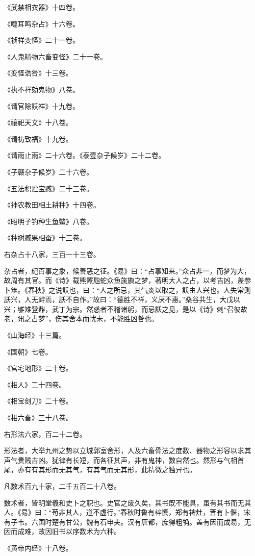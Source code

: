 \documentclass[]{article}
\begin{document}
《武禁相衣器》十四卷。

《嚏耳鸣杂占》十六卷。

《祯祥变怪》二十一卷。

《人鬼精物六畜变怪》二十一卷。

《变怪诰咎》十三卷。

《执不祥劾鬼物》八卷。

《请官除訞祥》十九卷。

《禳祀天文》十八卷。

《请祷致福》十九卷。

《请雨止雨》二十六卷。《泰壹杂子候岁》二十二卷。

《子赣杂子候岁》二十六卷。

《五法积贮宝臧》二十三卷。

《神农教田相土耕种》十四卷。

《昭明子钓种生鱼鳖》八卷。

《种树臧果相蚕》十三卷。

右杂占十八家，三百一十三卷。

杂占者，纪百事之象，候善恶之征。《易》曰：``占事知来。''众占非一，而梦为大，故周有其官。而《诗》载熊罴虺蛇众鱼旐旟之梦，著明大人之占，以考吉凶，盖参卜筮。《春秋》之说訞也，曰：``人之所忌，其气炎以取之，訞由人兴也。人失常则訞兴，人无衅焉，訞不自作。''故曰：``德胜不祥，义厌不惠。''桑谷共生，大戊以兴；雊雉登鼎，武丁为宗。然惑者不稽诸躬，而忌訞之见，是以《诗》刺``召彼故老，讯之占梦''，伤其舍本而忧未，不能胜凶咎也。

《山海经》十三篇。

《国朝》七卷。

《宫宅地形》二十卷。

《相人》二十四卷。

《相宝剑刀》二十卷。

《相六畜》三十八卷。

右形法六家，百二十二卷。

形法者，大举九州之势以立城郭室舍形，人及六畜骨法之度数、器物之形容以求其声气贵贱吉凶。犹律有长短，而各征其声，非有鬼神，数自然也。然形与气相首尾，亦有有其形而无其气，有其气而无其形，此精微之独异也。

凡数术百九十家，二千五百二十八卷。

数术者，皆明堂羲和史卜之职也。史官之废久矣，其书既不能具，虽有其书而无其人。《易》曰：``苟非其人，道不虚行。''春秋时鲁有梓慎，郑有裨灶，晋有卜偃，宋有子韦。六国时楚有甘公，魏有石申夫。汉有唐都，庶得粗觕。盖有因而成易，无因而成难，故因旧书以序数术为六种。

《黄帝内经》十八卷。
\end{document}
